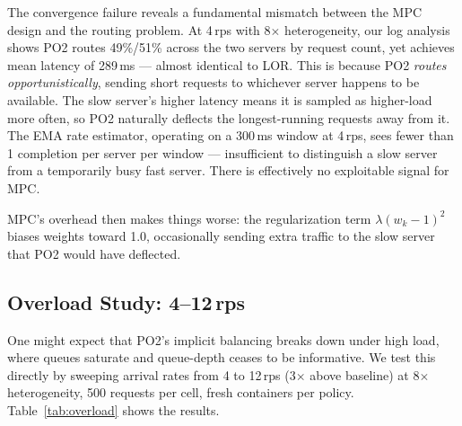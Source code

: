 \documentclass[blind]{gtac}
\begin{document}
The convergence failure reveals a fundamental mismatch between the MPC
design and the routing problem. At 4\,rps with 8$\times$ heterogeneity,
our log analysis shows PO2 routes 49\%/51\% across the two servers by
request count, yet achieves mean latency of 289\,ms --- almost identical
to LOR. This is because PO2 \emph{routes opportunistically}, sending
short requests to whichever server happens to be available.  The slow
server's higher latency means it is sampled as higher-load more often,
so PO2 naturally deflects the longest-running requests away from it.
The EMA rate estimator, operating on a 300\,ms window at 4\,rps, sees
fewer than 1 completion per server per window --- insufficient to
distinguish a slow server from a temporarily busy fast server.  There is
effectively no exploitable signal for MPC.

MPC's overhead then makes things worse: the regularization term
$\lambda(w_k-1)^2$ biases weights toward 1.0, occasionally sending
extra traffic to the slow server that PO2 would have deflected.

\subsection{Overload Study: 4--12\,rps}
\label{sec:overload}

One might expect that PO2's implicit balancing breaks down under high
load, where queues saturate and queue-depth ceases to be informative.
We test this directly by sweeping arrival rates from 4 to 12\,rps
(3$\times$ above baseline) at 8$\times$ heterogeneity, 500 requests
per cell, fresh containers per policy. Table~\ref{tab:overload} shows
the results.
\end{document}
